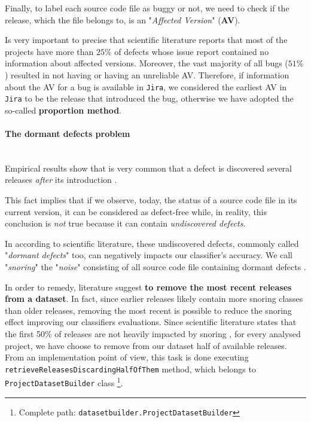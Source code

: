 \documentclass[sigconf]{acmart}
\begin{document}
Finally, to label each source code file as buggy or not, we need to check if the release, which the file belongs to, is an "\textit{Affected Version}" (\textbf{AV}).

Is very important to precise that scientific literature reports that most of the projects have more than $25\%$ of defects whose issue report contained no information about affected versions. Moreover, the vast majority of all bugs ($51\%$) resulted in not having or having an unreliable AV. Therefore, if information about the AV for a bug is available in \texttt{Jira}, we considered the earliest AV in \texttt{Jira} to be the release that introduced the bug, otherwise we have adopted the so-called \textbf{proportion method}.

\paragraph{The dormant defects problem}
\hfill\\
Empirical results show that is very common that a defect is discovered several releases \textit{after} its introduction \citep{Falessi}. 

This fact implies that if we observe, today, the status of a source code file in its current version, it can be considered as defect-free while, in reality, this conclusion is \textit{not} true because it can contain \textit{undiscovered defects}.

In according to scientific literature, these undiscovered defects, commonly called "\textit{dormant defects}" too, can negatively impacts our classifier's accuracy. We call "\textit{snoring}" the "\textit{noise}" consisting of all source code file containing dormant defects \citep{Falessi}.

In order to remedy, literature suggest \textbf{to remove the most recent releases from a dataset}. In fact, since earlier releases likely contain more snoring classes than older releases, removing the most recent is possible to reduce the snoring effect improving our classifiers evaluations. Since scientific literature states that the first 50\% of releases are not heavily impacted by snoring \citep{Falessi}, for every analysed project, we have choose to remove from our dataset half of available releases. From an implementation point of view, this task is done executing \texttt{retrieve\-Releases\-Discarding\-HalfOfThem} method, which belongs to \texttt{Project\-Dataset\-Builder} class \footnote{Complete path: \texttt{datasetbuilder.ProjectDatasetBuilder}}.
\end{document}
